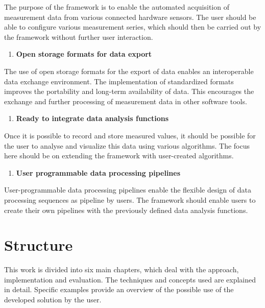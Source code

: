 The purpose of the framework is to enable the automated acquisition of
measurement data from various connected hardware sensors. The user
should be able to configure various measurement series, which should
then be carried out by the framework without further user interaction.

\begin{enumerate}
\def\labelenumi{\arabic{enumi}.}
\setcounter{enumi}{2}
\tightlist
\item
  \textbf{Open storage formats for data export}
\end{enumerate}

The use of open storage formats for the export of data enables an
interoperable data exchange environment. The implementation of
standardized formats improves the portability and long-term availability
of data. This encourages the exchange and further processing of
measurement data in other software tools.

\begin{enumerate}
\def\labelenumi{\arabic{enumi}.}
\setcounter{enumi}{3}
\tightlist
\item
  \textbf{Ready to integrate data analysis functions}
\end{enumerate}

Once it is possible to record and store measured values, it should be
possible for the user to analyse and visualize this data using various
algorithms. The focus here should be on extending the framework with
user-created algorithms.

\begin{enumerate}
\def\labelenumi{\arabic{enumi}.}
\setcounter{enumi}{4}
\tightlist
\item
  \textbf{User programmable data processing pipelines}
\end{enumerate}

User-programmable data processing pipelines enable the flexible design
of data processing sequences as pipeline by users. The framework should
enable users to create their own pipelines with the previously defined
data analysis functions.

\hypertarget{structure}{%
\section{Structure}\label{structure}}

This work is divided into six main chapters, which deal with the
approach, implementation and evaluation. The techniques and concepts
used are explained in detail. Specific examples provide an overview of
the possible use of the developed solution by the user.

